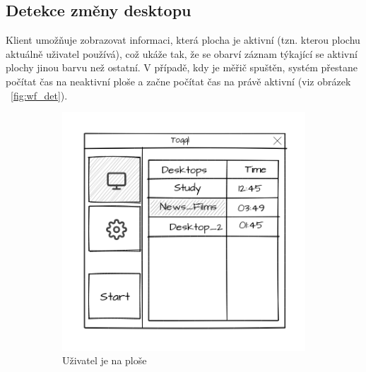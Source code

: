 \documentclass[thesis=B,czech]{FITthesis}[2012/06/26]
\begin{document}
\subsection{Detekce změny desktopu}
Klient umožňuje zobrazovat informaci, která plocha je aktivní (tzn. kterou plochu aktuálně uživatel používá), což ukáže tak, že se obarví záznam týkající se aktivní plochy jinou barvu než ostatní. V případě, kdy je měřič spuštěn, systém přestane počítat čas na neaktivní ploše a začne počítat čas na právě aktivní (viz obrázek ~\ref{fig:wf_det}). 

\begin{figure}[h]
		\begin{subfigure}[h]{0.5\linewidth}
		\includegraphics[width=\linewidth]{wf_list3.png}
		\caption{Uživatel je na ploše }
	\end{subfigure}
	\hfill
	\begin{subfigure}[h]{0.53\linewidth}

\end{subfigure}
\end{figure}
\end{document}
